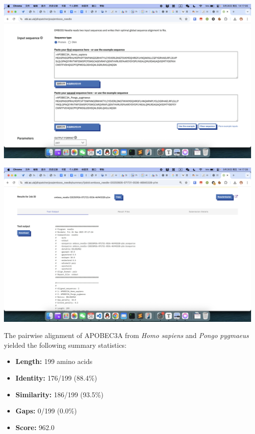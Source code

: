 \documentclass{article}
\begin{document}
\begin{center}
    \includegraphics[width=1\textwidth]{../images/task4/image1.png}
\end{center}
\begin{center}
    \includegraphics[width=1\textwidth]{../images/task4/image2.png}
\end{center}

The pairwise alignment of APOBEC3A from \textit{Homo sapiens} and \textit{Pongo pygmaeus} yielded the following summary statistics:

\begin{itemize}
    \item \textbf{Length:} 199 amino acids
    \item \textbf{Identity:} 176/199 (88.4\%)
    \item \textbf{Similarity:} 186/199 (93.5\%)
    \item \textbf{Gaps:} 0/199 (0.0\%)
    \item \textbf{Score:} 962.0
\end{itemize}
\end{document}

